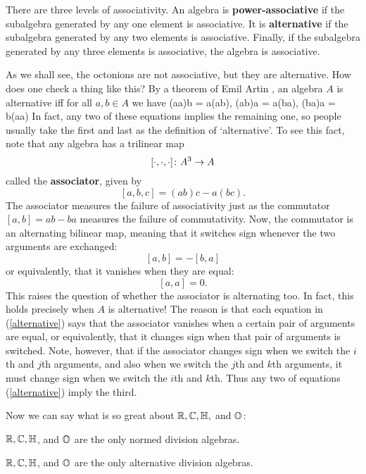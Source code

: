 There are three levels of associativity.  An algebra is {\bf   
power-associative} if the subalgebra generated by any one element is   
associative.  It is {\bf alternative} if the subalgebra generated by any   
two elements is associative.  Finally, if the subalgebra generated by any    
three elements is associative, the algebra is associative.     
   
As we shall see, the octonions are not associative, but they are alternative.   
How does one check a thing like this?  By a theorem of Emil Artin    
\cite{Schafer}, an algebra $A$ is alternative iff for all $a,b \in A$ we have   
\ba  (aa)b = a(ab), \qquad (ab)a = a(ba), \qquad (ba)a = b(aa)    
\label{alternative}   \ea   
In fact, any two of these equations implies the remaining one, so people   
usually take the first and last as the definition of `alternative'.   
To see this fact, note that any algebra has a trilinear map    
\[  [\cdot,\cdot,\cdot] \colon A^3 \to A  \]   
called the {\bf associator}, given by   
\[               [a,b,c] = (ab)c - a(bc)   .\]   
The associator measures the failure of associativity just as the 
commutator $[a,b] = ab - ba$ measures the failure of commutativity.   
Now, the commutator is an alternating bilinear map, meaning that it 
switches sign whenever the two arguments are exchanged:   
\[         [a,b] = -[b,a]   \]   
or equivalently, that it vanishes when they are equal:   
\[         [a,a] = 0 .\]   
This raises the question of whether the associator is alternating too.     
In fact, this holds precisely when $A$ is alternative!  The reason is   
that each equation in (\ref{alternative}) says that the associator   
vanishes when a certain pair of arguments are equal, or equivalently,   
that it changes sign when that pair of arguments is switched.  Note,   
however, that if the associator changes sign when we switch the $i$th   
and $j$th arguments, and also when we switch the $j$th and $k$th   
arguments, it must change sign when we switch the $i$th and $k$th.      
Thus any two of equations (\ref{alternative}) imply the third.     
   
Now we can say what is so great about ${\mathbb R},{\mathbb C},{\mathbb H},$ and ${\mathbb O}$:   
 
\begin{thm}  \et \label{hurwitz} 
${\mathbb R},{\mathbb C},{\mathbb H}$, and ${\mathbb O}$ are the only normed division algebras.  
\end{thm}  
 
\begin{thm} \et \label{zorn}   
${\mathbb R},{\mathbb C},{\mathbb H}$, and ${\mathbb O}$ are the only alternative division algebras.   
\end{thm}   
   
